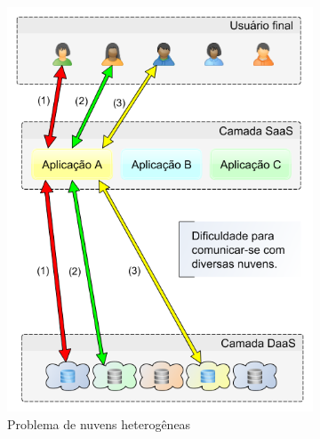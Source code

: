 \documentclass[11pt,a4paper]{article}
\begin{document}
\begin{figure}[!htbp]
  \begin{subfigure}[b]{0.4\textwidth}
    \includegraphics[width=\textwidth]{midasproblema}
    \caption{Problema de nuvens heterogêneas}
    \label{fig:midasproblema}
  \end{subfigure}
  \hfill
  \begin{subfigure}[b]{0.4\textwidth}

\end{subfigure}
\end{figure}
\end{document}
